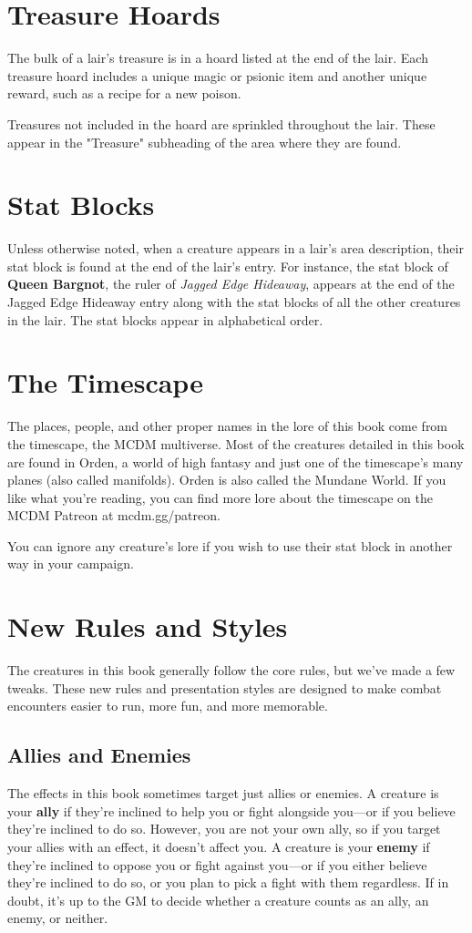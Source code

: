 \documentclass[10pt,a4paper,twoside,bg=print,twocolumn,openany,nodeprecatedcode]{dndbook}
\begin{document}
\section{Treasure Hoards}
The bulk of a lair's treasure is in a hoard listed at the end of the lair. Each treasure hoard includes a unique magic or psionic item and another unique reward, such as a recipe for a new poison.

Treasures not included in the hoard are sprinkled throughout the lair. These appear in the "Treasure" subheading of the area where they are found.

\section{Stat Blocks}
Unless otherwise noted, when a creature appears in a lair's area description, their stat block is found at the end of the lair's entry. For instance, the stat block of \textbf{Queen Bargnot}, the ruler of \textit{Jagged Edge Hideaway}, appears at the end of the Jagged Edge Hideaway entry along with the stat blocks of all the other creatures in the lair. The stat blocks appear in alphabetical order.

\section{The Timescape}
The places, people, and other proper names in the lore of this book come from the timescape, the MCDM multiverse. Most of the creatures detailed in this book are found in Orden, a world of high fantasy and just one of the timescape's many planes (also called manifolds). Orden is also called the Mundane World. If you like what you're reading, you can find more lore about the timescape on the MCDM Patreon at mcdm.gg/patreon.

You can ignore any creature's lore if you wish to use their stat block in another way in your campaign.

\section{New Rules and Styles}
The creatures in this book generally follow the core rules, but we've made a few tweaks. These new rules and presentation styles are designed to make combat encounters easier to run, more fun, and more memorable.

\subsection{Allies and Enemies}
The effects in this book sometimes target just allies or enemies. A creature is your \textbf{ally} if they're inclined to help you or fight alongside you—or if you believe they're inclined to do so. However, you are not your own ally, so if you target your allies with an effect, it doesn't affect you. A creature is your \textbf{enemy} if they're inclined to oppose you or fight against you—or if you either believe they're inclined to do so, or you plan to pick a fight with them regardless. If in doubt, it's up to the GM to decide whether a creature counts as an ally, an enemy, or neither.
\end{document}

